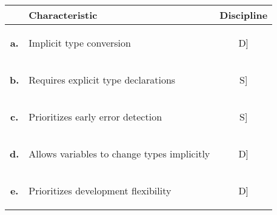 \documentclass[12pt, addpoints, answers]{exam}
\newif\ifprintanswers
\newcommand{\fillin}[1]{%
  \ifprintanswers
    \textbf{#1}%
  \else
    \underline{\hspace{2mm}}%
  \fi
}
\begin{document}
\begin{questions}
	\begin{table}[H]
		\centering
\centering
\normalsize
\setlength{\tabcolsep}{5pt} %
\renewcommand{\arraystretch}{1} %
		\begin{tabular}{|c|p{11cm}|c|}
			\hline
			&\textbf{Characteristic} & \textbf{Discipline} \\ \hline
		\textbf{	a.} & Implicit type conversion                    & \rule{0pt}{1cm}\fillin[D] \\ \hline
		\textbf{	b.} & Requires explicit type declarations         & \rule{0pt}{1cm}\fillin[S] \\ \hline
		\textbf{	c.} & Prioritizes early error detection           & \rule{0pt}{1cm}\fillin[S] \\ \hline
		\textbf{	d.} & Allows variables to change types implicitly & \rule{0pt}{1cm}\fillin[D] \\ \hline
		\textbf{	e.} & Prioritizes development flexibility         & \rule{0pt}{1cm}\fillin[D] \\ \hline
		\end{tabular}
	\end{table}

\newpage
				
	
	

\end{questions}
\end{document}
